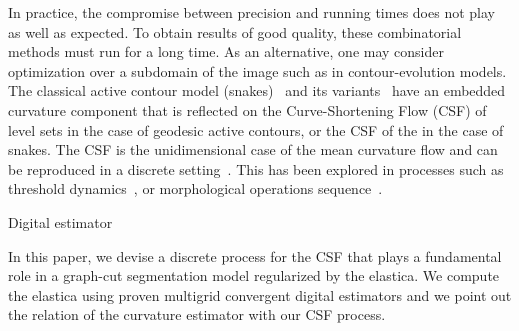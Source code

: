 \documentclass[smallextended]{svjour3}
\begin{document}
In practice, the compromise between precision and running times does
not play as well as expected. To obtain results of good quality, these
combinatorial methods must run for a long time. As an alternative, one
may consider optimization over a subdomain of the image such as in
contour-evolution models. The classical active contour model
(snakes)~\cite{kass1988snakes} and its
variants~\cite{caseles97geodesic,chan01} have an embedded curvature
component that is reflected on the Curve-Shortening Flow (CSF) of
level sets in the case of geodesic active contours, or the CSF of the
 in the case of snakes. The CSF is the
unidimensional case of the mean curvature flow and can be reproduced
in a discrete setting~\cite{merriman1992diffusion}. This has been
explored in processes such as threshold
dynamics~\cite{esedoglu2005threshold,esedoglu2008threshold}, or
morphological operations sequence~\cite{marquezneila14}.

Digital estimator 


In this paper, we devise a discrete process for the CSF that plays a fundamental
role in a graph-cut segmentation model regularized by the elastica. We compute the
elastica using proven multigrid convergent digital estimators and we point out
the relation of the curvature estimator with our CSF process.
\end{document}

